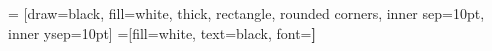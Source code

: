 

 = [draw=black, fill=white, thick, rectangle, rounded corners, inner sep=10pt, inner ysep=10pt]
 =[fill=white, text=black, font=\bfseries]
